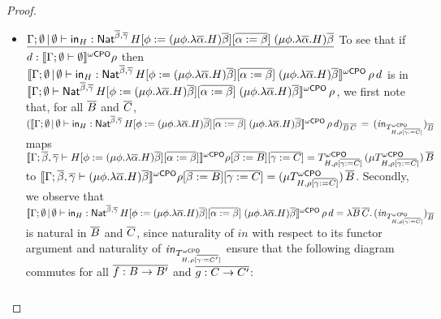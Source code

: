 \documentclass[acmsmall,review,anonymous]{acmart}
\theoremstyle{definition}
\begin{document}
\begin{proof}
\begin{itemize}
\item
$\underline{\Gamma;\emptyset \,|\, \emptyset \vdash \mathsf{in}_H :
  \mathsf{Nat}^{\overline{\beta},\overline{\gamma}} \, H[\phi := (\mu \phi.\lambda
    {\overline \alpha}.H){\overline \beta}][\overline{\alpha := \beta}]
  \;(\mu \phi.\lambda {\overline \alpha}.H){\overline \beta}}$\; To
  see that if $d : \llbracket{\Gamma;\emptyset \vdash \emptyset}\rrbracket^{{\omega\mathsf{CPO}}} \rho$
  then $\llbracket{\Gamma;\emptyset \,|\, \emptyset \vdash \mathsf{in}_H :
    \mathsf{Nat}^{\overline{\beta},\overline{\gamma}} \, H[\phi := (\mu \phi.\lambda
      {\overline \alpha}.H){\overline \beta}][\overline{\alpha := \beta}]
    \;(\mu \phi.\lambda {\overline \alpha}.H){\overline \beta}}\rrbracket^{{\omega\mathsf{CPO}}}\,
  \rho\,d$ is in\\ $\llbracket{\Gamma;\emptyset \vdash
    \mathsf{Nat}^{\overline{\beta},\overline{\gamma}} \, H[\phi := (\mu \phi.\lambda
      {\overline \alpha}.H){\overline \beta}][\overline{\alpha := \beta}]
    \;(\mu \phi.\lambda {\overline \alpha}.H){\overline \beta}}\rrbracket^{{\omega\mathsf{CPO}}}\,
  \rho$, we first note that, for all $\overline{B}$ and $\overline{C}$,
  $(\llbracket{\Gamma;\emptyset \,|\, \emptyset \vdash \mathsf{in}_H :
    \mathsf{Nat}^{\overline{\beta},\overline{\gamma}} \, H[\phi := (\mu \phi.\lambda
      {\overline \alpha}.H){\overline \beta}][\overline{\alpha := \beta}]
    \;(\mu \phi.\lambda {\overline \alpha}.H){\overline \beta}}\rrbracket^{{\omega\mathsf{CPO}}}\,
  \rho\,d)_{\overline{B}\,\overline{C}}\, =\,
  (\mathit{in}_{T^{\omega\mathsf{CPO}}_{H,\rho[\overline{\gamma := C}]}})_{\overline{B}}$ maps
  $\llbracket{\Gamma;\overline{\beta},\overline{\gamma} \vdash H[\phi := (\mu
      \phi.\lambda {\overline \alpha}.H){\overline \beta}][\overline{\alpha
        := \beta}]}\rrbracket^{{\omega\mathsf{CPO}}}\rho[\overline{\beta := B}][\overline{\gamma := C}] =
  T^{\omega\mathsf{CPO}}_{H,\rho[\overline{\gamma := C}]}\, (\mu T^{\omega\mathsf{CPO}}_{H,\rho[\overline{\gamma
        := C}]}) \, \overline{B}$ to $\llbracket{\Gamma;\overline{\beta},\overline{\gamma}
    \vdash (\mu \phi.\lambda {\overline \alpha}.H){\overline \beta}}\rrbracket^{{\omega\mathsf{CPO}}}
  \rho[\overline{\beta := B}][\overline{\gamma := C}] = (\mu
  T^{\omega\mathsf{CPO}}_{H,\rho[\overline{\gamma := C}]}) \, \overline{B}$. Secondly, we observe
  that\\ $\llbracket{\Gamma;\emptyset \,|\, \emptyset \vdash \mathsf{in}_H :
    \mathsf{Nat}^{\overline{\beta},\overline{\gamma}} \, H[\phi := (\mu \phi.\lambda
      {\overline \alpha}.H){\overline \beta}][\overline{\alpha := \beta}]
    \;(\mu \phi.\lambda {\overline \alpha}.H){\overline
      \beta}}\rrbracket^{{\omega\mathsf{CPO}}}\,\rho\,d = \lambda
  \overline{B}\,\overline{C}.\,(\mathit{in}_{T^{\omega\mathsf{CPO}}_{H,\rho[\overline{\gamma :=
          C}]}})_{\overline{B}}$ is natural in $\overline{B}$ and $\overline{C}$, since
  naturality of $\mathit{in}$ with respect to its functor argument and
  naturality of $\mathit{in}_{T^{\omega\mathsf{CPO}}_{H,\rho[\overline{\gamma := C'}]}}$ ensure
  that the following diagram commutes for all $\overline{f : B \to B'}$ and
  $\overline{g : C \to C'}$:
{\tiny
  \[\begin{tikzcd}[column sep=2.5in, row sep=0.75in]

\end{tikzcd}\]}
\end{itemize}
\end{proof}
\end{document}
